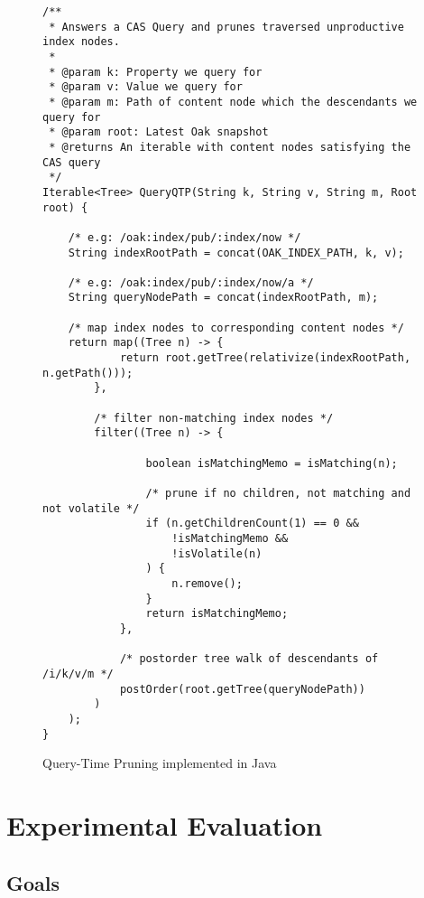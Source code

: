 \documentclass[abstracton,12pt]{scrartcl}
\theoremstyle{definition}
\begin{document}
\begin{figure}[H]
  \scriptsize
  \begin{framed}    
\begin{verbatim}
/**
 * Answers a CAS Query and prunes traversed unproductive index nodes.
 *
 * @param k: Property we query for
 * @param v: Value we query for
 * @param m: Path of content node which the descendants we query for
 * @param root: Latest Oak snapshot
 * @returns An iterable with content nodes satisfying the CAS query
 */
Iterable<Tree> QueryQTP(String k, String v, String m, Root root) {

    /* e.g: /oak:index/pub/:index/now */
    String indexRootPath = concat(OAK_INDEX_PATH, k, v); 

    /* e.g: /oak:index/pub/:index/now/a */
    String queryNodePath = concat(indexRootPath, m);

    /* map index nodes to corresponding content nodes */
    return map((Tree n) -> {
            return root.getTree(relativize(indexRootPath, n.getPath()));
        },

        /* filter non-matching index nodes */
        filter((Tree n) -> {
                
                boolean isMatchingMemo = isMatching(n);

                /* prune if no children, not matching and not volatile */
                if (n.getChildrenCount(1) == 0 &&
                    !isMatchingMemo &&
                    !isVolatile(n)
                ) {
                    n.remove();
                }
                return isMatchingMemo;
            },

            /* postorder tree walk of descendants of /i/k/v/m */
            postOrder(root.getTree(queryNodePath))
        )
    );
}
\end{verbatim}
  \end{framed}
  \caption[QTP implemented in Java]{Query-Time Pruning implemented in Java}
  \label{fig:java_qtp}
\end{figure}

\newpage

\section{Experimental Evaluation}
\label{sec:experimental-evaluation}

\subsection{Goals}
\end{document}
